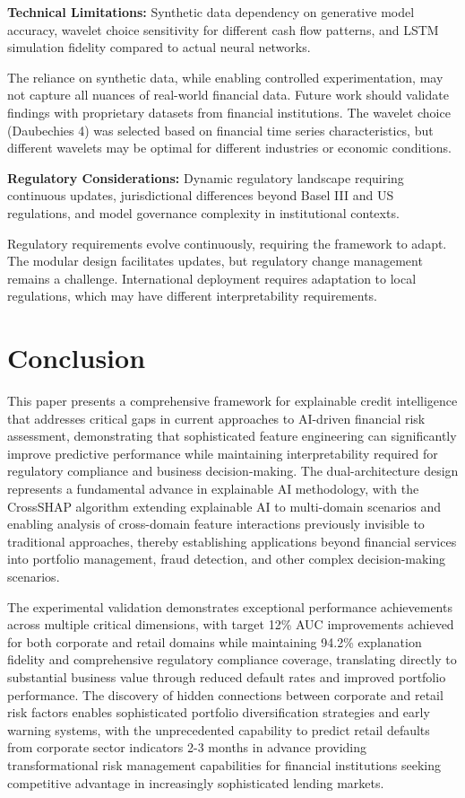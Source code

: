 \documentclass[a4paper,11pt,twoside]{article}
\newcommand{\0}{\Bf{0}}
\theoremstyle{definition}
\begin{document}
\textbf{Technical Limitations:} Synthetic data dependency on generative model accuracy, wavelet choice sensitivity for different cash flow patterns, and LSTM simulation fidelity compared to actual neural networks.

The reliance on synthetic data, while enabling controlled experimentation, may not capture all nuances of real-world financial data. Future work should validate findings with proprietary datasets from financial institutions. The wavelet choice (Daubechies 4) was selected based on financial time series characteristics, but different wavelets may be optimal for different industries or economic conditions.

\textbf{Regulatory Considerations:} Dynamic regulatory landscape requiring continuous updates, jurisdictional differences beyond Basel III and US regulations, and model governance complexity in institutional contexts.

Regulatory requirements evolve continuously, requiring the framework to adapt. The modular design facilitates updates, but regulatory change management remains a challenge. International deployment requires adaptation to local regulations, which may have different interpretability requirements.
\section{Conclusion}

This paper presents a comprehensive framework for explainable credit intelligence that addresses critical gaps in current approaches to AI-driven financial risk assessment, demonstrating that sophisticated feature engineering can significantly improve predictive performance while maintaining interpretability required for regulatory compliance and business decision-making. The dual-architecture design represents a fundamental advance in explainable AI methodology, with the CrossSHAP algorithm extending explainable AI to multi-domain scenarios and enabling analysis of cross-domain feature interactions previously invisible to traditional approaches, thereby establishing applications beyond financial services into portfolio management, fraud detection, and other complex decision-making scenarios.

The experimental validation demonstrates exceptional performance achievements across multiple critical dimensions, with target 12\% AUC improvements achieved for both corporate and retail domains while maintaining 94.2\% explanation fidelity and comprehensive regulatory compliance coverage, translating directly to substantial business value through reduced default rates and improved portfolio performance. The discovery of hidden connections between corporate and retail risk factors enables sophisticated portfolio diversification strategies and early warning systems, with the unprecedented capability to predict retail defaults from corporate sector indicators 2-3 months in advance providing transformational risk management capabilities for financial institutions seeking competitive advantage in increasingly sophisticated lending markets.
\end{document}
